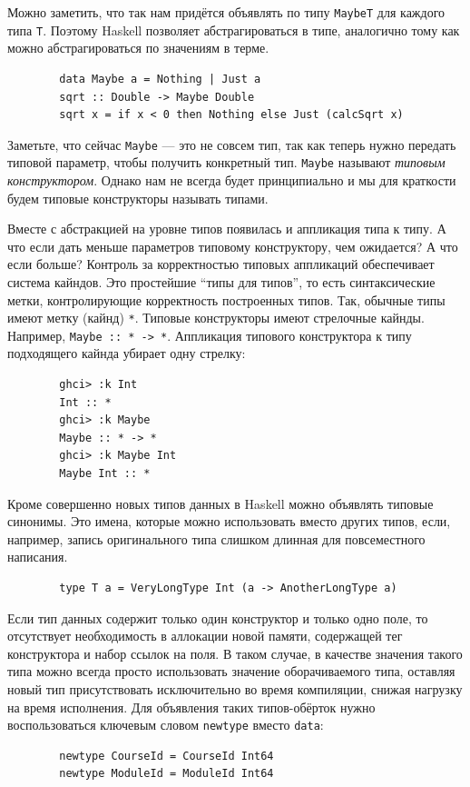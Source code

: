\documentclass[12pt]{article}
\newcommand{\point}[1]{{\color{blue}\textit{#1}}} %
\begin{document}
    Можно заметить, что так нам придётся объявлять по типу \texttt{MaybeT} для каждого типа \texttt{T}.
    Поэтому Haskell позволяет абстрагироваться в типе, аналогично тому как можно абстрагироваться по значениям в терме.
    \begin{verbatim}
        data Maybe a = Nothing | Just a
        sqrt :: Double -> Maybe Double
        sqrt x = if x < 0 then Nothing else Just (calcSqrt x)
    \end{verbatim}

    Заметьте, что сейчас \texttt{Maybe} --- это не совсем тип, так как теперь нужно передать типовой параметр, чтобы получить конкретный тип.
    \texttt{Maybe} называют \point{типовым конструктором}.
    Однако нам не всегда будет принципиально и мы для краткости будем типовые конструкторы называть типами.

    Вместе с абстракцией на уровне типов появилась и аппликация типа к типу.
    А что если дать меньше параметров типовому конструктору, чем ожидается?
    А что если больше?
    Контроль за корректностью типовых аппликаций обеспечивает система кайндов.
    Это простейшие ``типы для типов'', то есть синтаксические метки, контролирующие корректность построенных типов.
    Так, обычные типы имеют метку (кайнд) \texttt{*}.
    Типовые конструкторы имеют стрелочные кайнды.
    Например, \texttt{Maybe :: * -> *}.
    Аппликация типового конструктора к типу подходящего кайнда убирает одну стрелку:
    \begin{verbatim}
        ghci> :k Int
        Int :: *
        ghci> :k Maybe
        Maybe :: * -> *
        ghci> :k Maybe Int
        Maybe Int :: *
    \end{verbatim}

    Кроме совершенно новых типов данных в Haskell можно объявлять типовые синонимы.
    Это имена, которые можно использовать вместо других типов, если, например, запись оригинального типа слишком длинная для повсеместного написания.
    \begin{verbatim}
        type T a = VeryLongType Int (a -> AnotherLongType a)
    \end{verbatim}

    Если тип данных содержит только один конструктор и только одно поле, то отсутствует необходимость в аллокации новой памяти, содержащей тег конструктора и набор ссылок на поля.
    В таком случае, в качестве значения такого типа можно всегда просто использовать значение оборачиваемого типа, оставляя новый тип присутствовать исключительно во время компиляции, снижая нагрузку на время исполнения.
    Для объявления таких типов-обёрток нужно воспользоваться ключевым словом \texttt{newtype} вместо \texttt{data}:
    \begin{verbatim}
        newtype CourseId = CourseId Int64
        newtype ModuleId = ModuleId Int64
    \end{verbatim}
\end{document}
